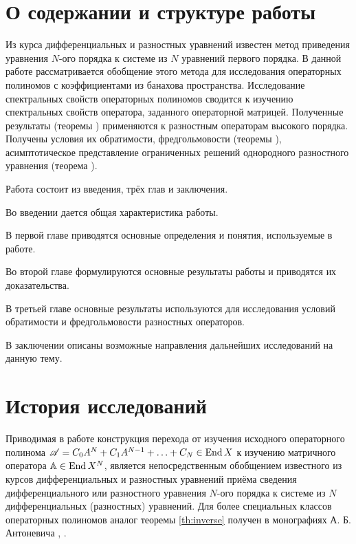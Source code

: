 \intro
\section*{О содержании и структуре работы}
Из курса дифференциальных и разностных уравнений известен метод приведения уравнения $N$-ого порядка к системе из $N$ уравнений первого порядка. В данной работе рассматривается обобщение этого метода для исследования операторных полиномов с коэффициентами из банахова пространства. Исследование спектральных свойств операторных полиномов сводится к изучению спектральных свойств оператора, заданного операторной матрицей. Полученные результаты (теоремы ) применяются к разностным операторам высокого порядка. Получены условия их обратимости, фредгольмовости (теоремы ), асимптотическое представление ограниченных решений однородного разностного уравнения (теорема ).

Работа состоит из введения, трёх глав и заключения.

Во введении дается общая характеристика работы.

В первой главе приводятся основные определения и понятия, используемые в работе.

Во второй главе формулируются основные результаты работы и приводятся их доказательства.

В третьей главе основные результаты используются для исследования условий обратимости и фредгольмовости разностных операторов.

В заключении описаны возможные направления дальнейших исследований на данную тему.

\section*{История исследований}
Приводимая в работе конструкция перехода от изучения исходного операторного полинома $\mathcal A = C_0 A^N + C_1 A^{N - 1} + \dotsc + C_N \in \operatorname{End} X$ к изучению матричного оператора $\mathbb A \in \operatorname{End} X^N$, является непосредственным обобщением известного из курсов дифференциальных и разностных уравнений приёма сведения дифференциального или разностного уравнения $N$-ого порядка к системе из $N$ дифференциальных (разностных) уравнений. Для более специальных классов операторных полиномов аналог теоремы \ref{th:inverse} получен в монографиях А. Б. Антоневича \cite[теорема 9.1]{antonevich2}, \cite{antonevich}.


